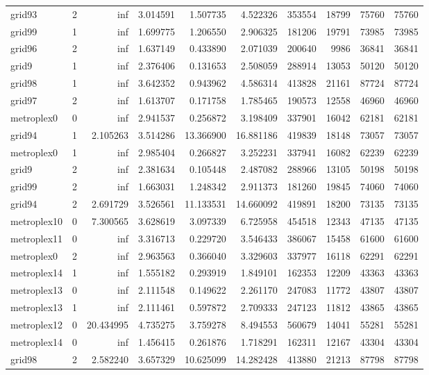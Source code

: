\begin{longtable}{|l|r|r|r|r|r|r|r|r|r|}
grid93 & 2 & inf & 3.014591 & 1.507735 & 4.522326 & 353554 & 18799 & 75760 & 75760 \\
grid99 & 1 & inf & 1.699775 & 1.206550 & 2.906325 & 181206 & 19791 & 73985 & 73985 \\
grid96 & 2 & inf & 1.637149 & 0.433890 & 2.071039 & 200640 & 9986 & 36841 & 36841 \\
grid9 & 1 & inf & 2.376406 & 0.131653 & 2.508059 & 288914 & 13053 & 50120 & 50120 \\
grid98 & 1 & inf & 3.642352 & 0.943962 & 4.586314 & 413828 & 21161 & 87724 & 87724 \\
grid97 & 2 & inf & 1.613707 & 0.171758 & 1.785465 & 190573 & 12558 & 46960 & 46960 \\
metroplex0 & 0 & inf & 2.941537 & 0.256872 & 3.198409 & 337901 & 16042 & 62181 & 62181 \\
grid94 & 1 & 2.105263 & 3.514286 & 13.366900 & 16.881186 & 419839 & 18148 & 73057 & 73057 \\
metroplex0 & 1 & inf & 2.985404 & 0.266827 & 3.252231 & 337941 & 16082 & 62239 & 62239 \\
grid9 & 2 & inf & 2.381634 & 0.105448 & 2.487082 & 288966 & 13105 & 50198 & 50198 \\
grid99 & 2 & inf & 1.663031 & 1.248342 & 2.911373 & 181260 & 19845 & 74060 & 74060 \\
grid94 & 2 & 2.691729 & 3.526561 & 11.133531 & 14.660092 & 419891 & 18200 & 73135 & 73135 \\
metroplex10 & 0 & 7.300565 & 3.628619 & 3.097339 & 6.725958 & 454518 & 12343 & 47135 & 47135 \\
metroplex11 & 0 & inf & 3.316713 & 0.229720 & 3.546433 & 386067 & 15458 & 61600 & 61600 \\
metroplex0 & 2 & inf & 2.963563 & 0.366040 & 3.329603 & 337977 & 16118 & 62291 & 62291 \\
metroplex14 & 1 & inf & 1.555182 & 0.293919 & 1.849101 & 162353 & 12209 & 43363 & 43363 \\
metroplex13 & 0 & inf & 2.111548 & 0.149622 & 2.261170 & 247083 & 11772 & 43807 & 43807 \\
metroplex13 & 1 & inf & 2.111461 & 0.597872 & 2.709333 & 247123 & 11812 & 43865 & 43865 \\
metroplex12 & 0 & 20.434995 & 4.735275 & 3.759278 & 8.494553 & 560679 & 14041 & 55281 & 55281 \\
metroplex14 & 0 & inf & 1.456415 & 0.261876 & 1.718291 & 162311 & 12167 & 43304 & 43304 \\
grid98 & 2 & 2.582240 & 3.657329 & 10.625099 & 14.282428 & 413880 & 21213 & 87798 & 87798 \\

\end{longtable}
